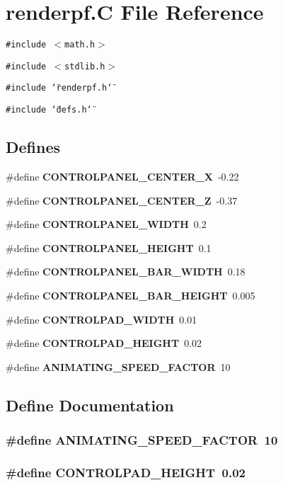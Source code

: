 \section{renderpf.C File Reference}
\label{renderpf_C}
{\tt \#include $<$math.h$>$}\par
{\tt \#include $<$stdlib.h$>$}\par
{\tt \#include \char`\"{}renderpf.h\char`\"{}}\par
{\tt \#include \char`\"{}defs.h\char`\"{}}\par
\subsection*{Defines}
\begin{CompactItemize}
\item 
\#define {\bf CONTROLPANEL\_\-CENTER\_\-X}\ -0.22
\item 
\#define {\bf CONTROLPANEL\_\-CENTER\_\-Z}\ -0.37
\item 
\#define {\bf CONTROLPANEL\_\-WIDTH}\ 0.2
\item 
\#define {\bf CONTROLPANEL\_\-HEIGHT}\ 0.1
\item 
\#define {\bf CONTROLPANEL\_\-BAR\_\-WIDTH}\ 0.18
\item 
\#define {\bf CONTROLPANEL\_\-BAR\_\-HEIGHT}\ 0.005
\item 
\#define {\bf CONTROLPAD\_\-WIDTH}\ 0.01
\item 
\#define {\bf CONTROLPAD\_\-HEIGHT}\ 0.02
\item 
\#define {\bf ANIMATING\_\-SPEED\_\-FACTOR}\ 10
\end{CompactItemize}


\subsection{Define Documentation}
\subsubsection{\setlength{\rightskip}{0pt plus 5cm}\#define ANIMATING\_\-SPEED\_\-FACTOR\ 10}\label{renderpf_C_a8}


\subsubsection{\setlength{\rightskip}{0pt plus 5cm}\#define CONTROLPAD\_\-HEIGHT\ 0.02}\label{renderpf_C_a7}


